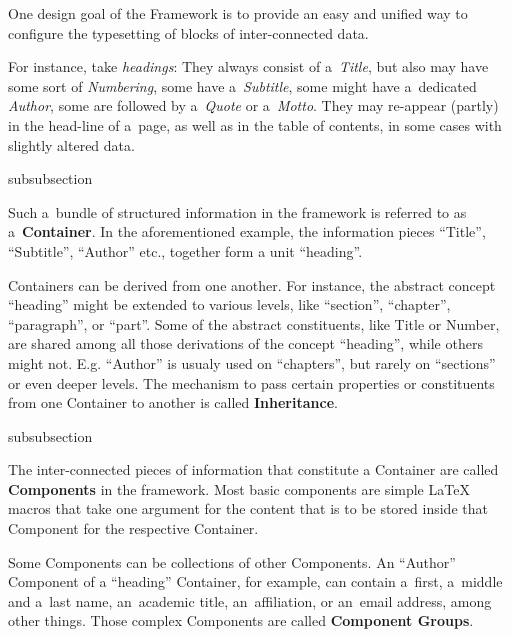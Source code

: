 One design goal of the {\CoCoTeX} Framework is to provide an easy and
unified way to configure the typesetting of blocks of inter-connected
data.

For instance, take \textit{headings}: They always consist of
a~\textit{Title}, but also may have some sort of \textit{Numbering},
some have a~\textit{Subtitle}, some might have a~dedicated
\textit{Author}, some are followed by a~\textit{Quote} or
a~\textit{Motto}. They may re-appear (partly) in the head-line of
a~page, as well as in the table of contents, in some cases with
slightly altered data.


\begin{heading}[label=sec:overview.containers]{subsubsection}
\end{heading}

Such a~bundle of structured information in the {\CoCoTeX} framework is
referred to as a~\textbf{Container}. In the
aforementioned example, the information pieces “Title”, “Subtitle”,
“Author” etc., together form a unit “heading”.

Containers can be derived from one another. For instance, the abstract
concept “heading” might be extended to various levels, like “section”,
“chapter”, “paragraph”, or “part”. Some of the abstract constituents,
like Title or Number, are shared among all those derivations of the
concept “heading”, while others might not. E.g. “Author” is usualy
used on “chapters”, but rarely on “sections” or even deeper
levels. The mechanism to pass certain properties or constituents from
one Container to another is called
\textbf{Inheritance}.

\begin{heading}[label=sec:overview.components]{subsubsection}
\end{heading}

The inter-connected pieces of information that constitute a Container
are called \textbf{Components} in the
{\CoCoTeX} framework. Most basic components are simple {\LaTeX} macros
that take one argument for the content that is to be stored inside
that Component for the respective Container.

Some Components can be collections of other Components. An “Author”
Component of a “heading” Container, for example, can contain a~first,
a~middle and a~last name, an~academic title, an~affiliation, or
an~email address, among other things. Those complex Components are
called \textbf{Component Groups}.

